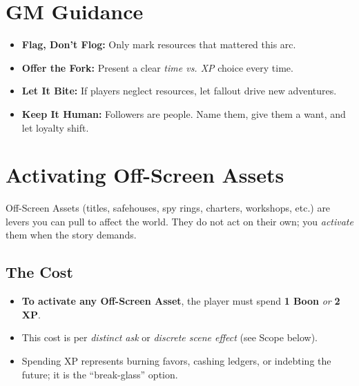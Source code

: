 \documentclass[12pt]{book}
\begin{document}
\section{GM Guidance}
\begin{itemize}
  \item \textbf{Flag, Don’t Flog:} Only mark resources that mattered this arc.
  \item \textbf{Offer the Fork:} Present a clear \emph{time vs. XP} choice every time.
  \item \textbf{Let It Bite:} If players neglect resources, let fallout drive new adventures.
  \item \textbf{Keep It Human:} Followers are people. Name them, give them a want, and let loyalty shift.
\end{itemize}

\section{Activating Off-Screen Assets}
\label{sec:asset-activation}

Off-Screen Assets (titles, safehouses, spy rings, charters, workshops, etc.) are levers you can pull to affect the world. They do not act on their own; you \emph{activate} them when the story demands.

\subsection*{The Cost}
\begin{itemize}
  \item \textbf{To activate any Off-Screen Asset}, the player must spend \textbf{1 Boon} \emph{or} \textbf{2 XP}.
  \item This cost is per \emph{distinct ask} or \emph{discrete scene effect} (see Scope below).
  \item Spending XP represents burning favors, cashing ledgers, or indebting the future; it is the ``break-glass'' option.
\end{itemize}
\end{document}
